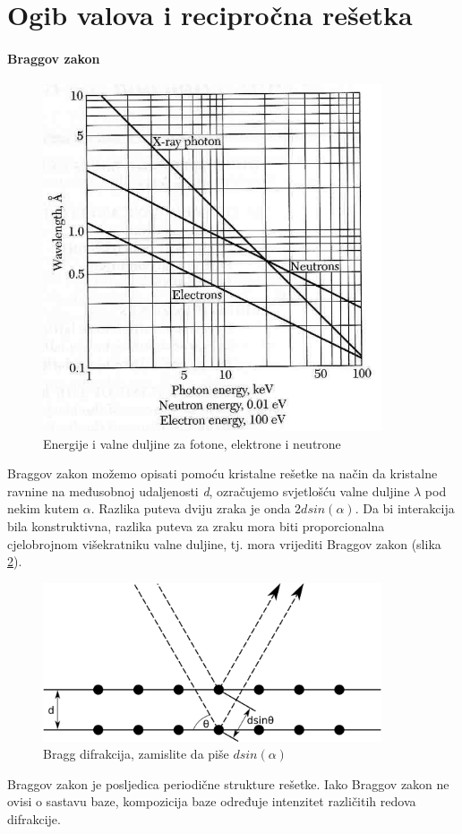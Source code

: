 \documentclass{article}
\numberwithin{equation}{section}
\begin{document}
\newpage
\section{Ogib valova i recipročna rešetka}
\paragraph{Braggov zakon}

\begin{figure}[h!]
    \centering
    \includegraphics[width=10cm]{Slika_9.PNG}
    \caption{Energije i valne duljine za fotone, elektrone i neutrone}
    \label{fig:S10}
\end{figure}
Braggov zakon možemo opisati pomoću kristalne rešetke na način da kristalne ravnine na međusobnoj udaljenosti \textit{d}, ozračujemo svjetlošću valne duljine $\lambda$ pod nekim kutem $\alpha$. Razlika puteva dviju zraka je onda $2dsin(\alpha)$. Da bi interakcija bila konstruktivna, razlika puteva za zraku mora biti proporcionalna cjelobrojnom višekratniku valne duljine, tj. mora vrijediti Braggov zakon (slika \ref{bragg}).
\begin{figure}[h!]
    \centering
    \includegraphics[width=10cm]{Bragg1.png}
    \caption{Bragg difrakcija, zamislite da piše $d sin(\alpha)$}
    \label{bragg}
\end{figure}
Braggov zakon je posljedica periodične strukture rešetke. Iako Braggov zakon ne ovisi o sastavu baze, kompozicija baze određuje intenzitet različitih redova difrakcije. 
\end{document}
